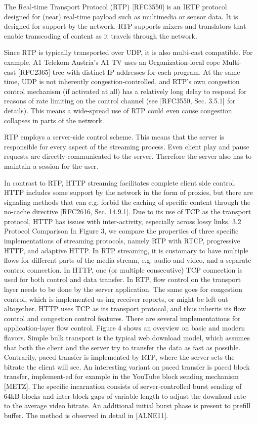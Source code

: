 The Real-time Transport Protocol (RTP) [RFC3550] is an IETF protocol designed for (near) real-time payload such as multimedia or sensor data. It is designed for support by the network. RTP supports mixers and translators that enable transcoding of content as it travels through the network.

Since RTP is typically transported over UDP, it is also multi-cast compatible. For example, A1 Telekom Austria’s A1 TV uses an Organization-local cope Multi-cast [RFC2365] tree with distinct IP addresses for each program. At the same time, UDP is not inherently congestion-controlled, and RTP’s own congestion control mechanism (if activated at all) has a relatively long delay to respond for reasons of rate limiting on the control channel (see [RFC3550, Sec. 3.5.1] for details). This means a wide-spread use of RTP could even cause congestion collapses in parts of the network.

RTP employs a server-side control scheme. This means that the server is responsible for every aspect of the streaming process. Even client play and pause requests are directly communicated to the server. Therefore the server also has to maintain a session for the user.



In contrast to RTP, HTTP streaming facilitates complete client side control. HTTP includes some support by the network in the form of proxies, but there are signaling methods that can e.g. forbid the caching of specific content through the no-cache directive [RFC2616, Sec. 14.9.1].
Due to its use of TCP as the transport protocol, HTTP has issues with inter-activity, especially across lossy links.
3.2	Protocol Comparison
In Figure 3, we compare the properties of three specific implementations of streaming protocols, namely RTP with RTCP, progressive HTTP, and adaptive HTTP. In RTP streaming, it is customary to have multiple flows for different parts of the media stream, e.g. audio and video, and a separate control connection. In HTTP, one (or multiple consecutive) TCP connection is used for both control and data transfer.
In RTP, flow control on the transport layer needs to be done by the server application. The same goes for congestion control, which is implemented us-ing receiver reports, or might be left out altogether. HTTP uses TCP as its transport protocol, and thus inherits its flow control and congestion control features.
There are several implementations for application-layer flow control. Figure 4 shows an overview on basic and modern flavors. Simple bulk transport is the typical web download model, which assumes that both the client and the server try to transfer the data as fast as possible. Contrarily, paced transfer is implemented by RTP, where the server sets the bitrate the client will see. An interesting variant on paced transfer is paced block transfer, implement-ed for example in the YouTube block sending mechanism [METZ]. The specific incarnation consists of server-controlled burst sending of 64kB blocks and inter-block gaps of variable length to adjust the download rate to the average video bitrate. An additional initial burst phase is present to prefill buffer. The method is observed in detail in [ALNE11].
 
